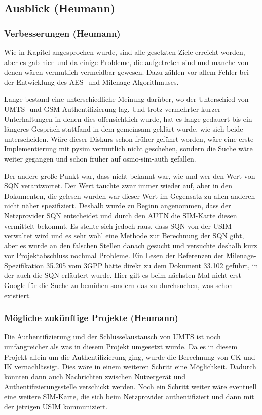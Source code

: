 	\subsection{Ausblick (Heumann)}
		\subsubsection{Verbesserungen (Heumann)}
		Wie in Kapitel  angesprochen wurde, sind alle gesetzten
		Ziele erreicht worden, aber es gab hier und da einige Probleme, die aufgetreten
		sind und manche von denen wären vermutlich vermeidbar gewesen. Dazu zählen vor
		allem Fehler bei der Entwicklung des AES- und Milenage-Algorithmuses.
		
		Lange bestand eine unterschiedliche Meinung darüber, wo der Unterschied von UMTS-
		und GSM-Authentifizierung lag. Und trotz vermehrter kurzer Unterhaltungen in
		denen dies offensichtlich wurde, hat es lange gedauert bis ein längeres Gespräch
		stattfand in dem gemeinsam geklärt wurde, wie sich beide unterscheiden. Wäre
		dieser Diskurs schon früher geführt worden, wäre eine erste Implementierung mit
		pysim vermutlich nicht geschehen, sondern die Suche wäre weiter gegangen und
		schon früher auf osmo-sim-auth gefallen.
		
		Der andere große Punkt war, dass nicht bekannt war, wie und wer den Wert von SQN
		verantwortet. Der Wert tauchte zwar immer wieder auf, aber in den Dokumenten,
		die gelesen wurden war dieser Wert im Gegensatz zu allen anderen nicht näher
		spezifiziert. Deshalb wurde zu Beginn angenommen, dass der Netzprovider SQN
		entscheidet und durch den AUTN die SIM-Karte diesen vermittelt bekommt. Es
		stellte sich jedoch raus, dass SQN von der USIM verwaltet wird und es sehr wohl
		eine Methode zur Berechnung der SQN gibt, aber es wurde an den falschen Stellen
		danach gesucht und versuchte deshalb kurz vor Projektabschluss nochmal Probleme.
		Ein Lesen der Referenzen der Milenage-Spezifikation 35.205 vom 3GPP hätte direkt
		zu dem Dokument 33.102 geführt, in der auch die SQN erläutert wurde. Hier gilt
		es beim nächsten Mal nicht erst Google für die Suche zu bemühen sondern das zu
		durchsuchen, was schon existiert.
		
		\subsubsection{Mögliche zukünftige Projekte (Heumann)}
		Die Authentifizierung und der Schlüsselaustausch von UMTS ist noch umfangreicher
		als was in diesem Projekt umgesetzt wurde. Da es in diesem Projekt allein um die
		Authentifizierung ging, wurde die Berechnung von CK und IK vernachlässigt. Dies
		wäre in einem weiteren Schritt eine Möglichkeit. Dadurch könnten dann auch
		Nachrichten zwischen Nutzergerät und Authentifizierungsstelle verschickt werden.
		Noch ein Schritt weiter wäre eventuell eine weitere SIM-Karte, die sich beim
		Netzprovider authentifiziert und dann mit der jetzigen USIM kommuniziert.

